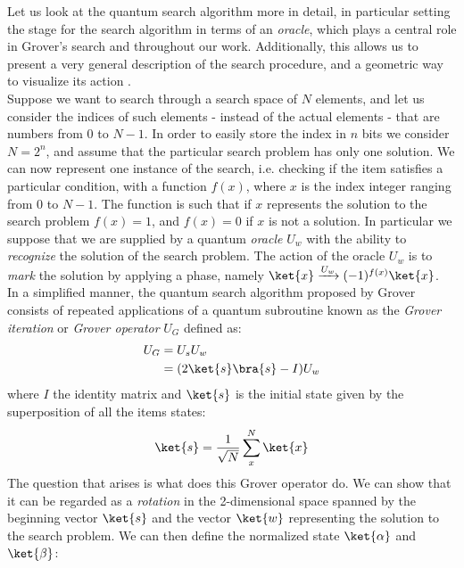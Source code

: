 \noindent
Let us look at the quantum search algorithm more in detail, in particular setting the stage for the search algorithm in terms of an \textit{oracle}, which plays a central role in Grover's search and throughout our work. Additionally, this allows us to present a very general description of the search procedure, and a geometric way to visualize its action \cite{Nielsen2000}. \\

\noindent
Suppose we want to search through a search space of $N$ elements, and let us consider the indices of such elements - instead of the actual elements - that are numbers from 0 to $N-1$. In order to easily store the index in $n$ bits we consider $N=2^n$, and assume that the particular search problem has only one solution. We can now represent one instance of the search, i.e. checking if the item satisfies a particular condition, with a function $f(x)$, where $x$ is the index integer ranging from 0 to $N-1$. The function is such that if $x$ represents the solution to the search problem $f(x)=1$, and $f(x)=0$ if $x$ is not a solution. In particular we suppose that we are supplied by a quantum \textit{oracle} $U_w$ with the ability to \textit{recognize} the solution of the search problem. The action of the oracle $U_w$ is to \textit{mark} the solution by applying a phase, namely $\ket{x}\xrightarrow{U_w}(-1)^{f(x)}\ket{x}$. \\ In a simplified manner, the quantum search algorithm proposed by Grover consists of repeated applications of a quantum subroutine known as the \textit{Grover iteration} or \textit{Grover operator} $U_G$ defined as:
\begin{equation}
  \begin{split}
    U_G & = U_s U_w \\
    & =  (2\ket{s}\bra{s}-I)U_w
  \end{split}
\end{equation}
where $I$ the identity matrix and $\ket{s}$ is the initial state given by the superposition of all the items states:
\begin{equation}
  \ket{s} = \frac{1}{\sqrt{N}}\sum_x^N\ket{x}
\end{equation}
The question that arises is what does this Grover operator do. We can show that it can be regarded as a \textit{rotation} in the 2-dimensional space spanned by the beginning vector $\ket{s}$ and the vector $\ket{w}$ representing the solution to the search problem. We can then define the normalized state $\ket{\alpha}$ and $\ket{\beta}$:
